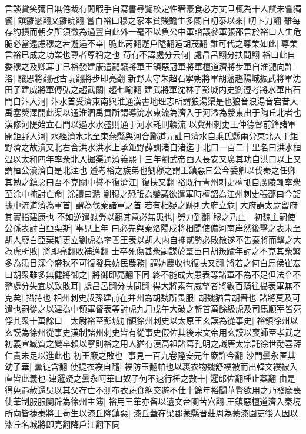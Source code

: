 言談賞笑彌日無倦裁有閒暇手自寫書尋覽校定性奢豪食必方丈旦輒為十人饌未嘗獨餐|{
	饌雛戀翻又雛皖翻}
嘗白裕曰穆之家本貧賤贍生多闕自叨沗以來|{
	叨卜刀翻}
雖每存約損而朝夕所須微為過豐自此外一毫不以負公中軍諮議參軍張邵言於裕曰人生危脆必當遠慮穆之若邂逅不幸|{
	脆此芮翻邂戶隘翻逅胡茂翻}
誰可代之尊業如此|{
	尊業言裕已成之功業也尊者尊稱之也}
苟有不諱處分云何|{
	處昌呂翻分扶問翻}
裕曰此自委穆之及卿耳丁巳裕發建康遣龍驤將軍王鎮惡冠軍將軍檀道濟將步軍自淮淝向許洛|{
	驤思將翻冠古玩翻將步即亮翻}
新野太守朱超石寧朔將軍胡藩趨陽城振武將軍沈田子建威將軍傅弘之趨武關|{
	趨七喻翻}
建武將軍沈林子彭城内史劉遵考將水軍出石門自汴入河|{
	汴水首受濟東南與淮通漢書地理志所謂狼湯渠是也狼音浪湯音宕昔大禹塞熒澤開此渠以通淮泗禹貢所謂導沇水東流為濟入于河溢為滎東出于陶丘北者也漢修河隄始立石門以遏水水盛則通于河水耗則輟流}
以冀州刺史王仲德督前鋒諸軍開鉅野入河|{
	水經濟水北至東燕縣與河合酈道元註曰濟水自乘氏縣兩分東北入于鉅野濟之故瀆又北右合洪水洪水上承鉅野薛訓渚自渚迄于北口一百二十里名曰洪水桓温以太和四年率衆北入掘渠通濟義熙十三年劉武帝西入長安又廣其功自洪口以上又謂桓公瀆濟自是北注也}
遵考裕之族弟也劉穆之謂王鎮惡曰公今委卿以伐秦之任卿其勉之鎮惡曰吾不克關中誓不復濟江|{
	復扶又翻}
裕既行青州刺史檀祇自廣陵輒率衆至涂中掩討亡命|{
	涂讀曰滁}
劉穆之恐祇為變議欲遣軍時檀韶為江州刺史張邵曰今韶據中流道濟為軍首|{
	謂為伐秦諸軍之首}
若有相疑之跡則大府立危|{
	大府謂太尉留府其實指建康也}
不如逆遣慰勞以觀其意必無患也|{
	勞力到翻}
穆之乃止　初魏主嗣使公孫表討白亞栗斯|{
	事見上年}
曰必先與秦洛陽戍將相聞使備河南岸然後擊之表未至胡人廢白亞栗斯更立劉虎為率善王表以胡人内自攜貳勢必敗散遂不吿秦將而擊之大為虎所敗|{
	將即亮翻敗補邁翻}
士卒死傷甚衆嗣謀於羣臣曰胡叛踰年討之不克其衆繁多為患日深今盛秋不可復發兵妨民農務|{
	謂妨農收也復扶又翻}
將若之何白馬侯崔宏曰胡衆雖多無健將御之|{
	將御即亮翻下同}
終不能成大患表等諸軍不為不足但法令不整處分失宜以致敗耳|{
	處昌呂翻分扶問翻}
得大將素有威望者將數百騎往攝表軍無不克矣|{
	攝持也}
相州刺史叔孫建前在并州為胡魏所畏服|{
	胡魏猶言胡晉也}
諸將莫及可遣也嗣從之以建為中領軍督表等討虎九月戊午大破之斬首萬餘級虎及司馬順宰皆死俘其衆十萬餘口　太尉裕至彭城加領徐州刺史以太原王玄謨為從事史|{
	裕領徐州以玄謨為徐州從事史漢制諸州刺史皆有從事史假佐其後宋文帝用玄謨以喪師至孝武之初義宣臧質之變卒賴以寧則裕之用人猶有漢高祖諸葛孔明之讖唐太宗託徐世勣喜薛仁貴未足以進此也}
初王廞之敗也|{
	事見一百九卷隆安元年廞許今翻}
沙門曇永匿其幼子華|{
	曇徒含翻}
使提衣襆自隨|{
	襆防玉翻帕也以裹衣物魏舒襆被而出韓文襆被入直皆此義也}
津邏疑之曇永呵華曰奴子何不速行棰之數十|{
	邏郎佐翻棰止蘂翻}
由是得免遇赦還吳以其父存亡不測布衣蔬食絶交遊不仕十餘年裕聞華賢欲用之乃發廞喪使華制服服闋辟為徐州主簿|{
	裕用王華亦留以遺文帝闋苦穴翻}
王鎮惡檀道濟入秦境所向皆捷秦將王苟生以漆丘降鎮惡|{
	漆丘蓋在梁郡蒙縣晋莊周為蒙漆園吏後人因以漆丘名城將即亮翻降戶江翻下同}
